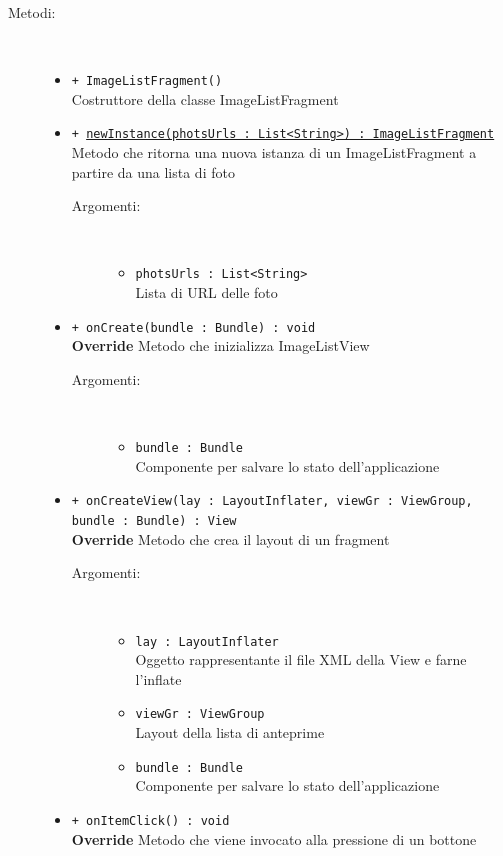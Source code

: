 \documentclass[../DefinizioneDiProdotto.tex]{subfiles}
\begin{document}
\begin{description}
\begin{itemize}
\end{itemize}
\item[Metodi:] \
\begin{itemize}
\item \texttt{+ ImageListFragment()}\\
Costruttore della classe ImageListFragment
 \item \texttt{+ \underline{newInstance(photsUrls : List<String>) : ImageListFragment}}\\
Metodo che ritorna una nuova istanza di un ImageListFragment a partire da una lista di foto
 \begin{description}
\item[Argomenti:] \
\begin{itemize}
\item \texttt{photsUrls : List<String>}\\
Lista di URL delle foto\end{itemize}
\end{description}
\item \texttt{+ onCreate(bundle : Bundle) : void}\\
\textbf{Override} Metodo che inizializza ImageListView
 \begin{description}
\item[Argomenti:] \
\begin{itemize}
\item \texttt{bundle : Bundle}\\
Componente per salvare lo stato dell'applicazione\end{itemize}
\end{description}
\item \texttt{+ onCreateView(lay : LayoutInflater, viewGr : ViewGroup, bundle : Bundle) : View}\\
\textbf{Override} Metodo che crea il layout di un fragment
 \begin{description}
\item[Argomenti:] \
\begin{itemize}
\item \texttt{lay : LayoutInflater}\\
Oggetto rappresentante il file XML della View e farne l'inflate\item \texttt{viewGr : ViewGroup}\\
Layout della lista di anteprime\item \texttt{bundle : Bundle}\\
Componente per salvare lo stato dell'applicazione\end{itemize}
\end{description}
\item \texttt{+ onItemClick() : void}\\
\textbf{Override} Metodo che viene invocato alla pressione di un bottone
 \end{itemize}
\end{description}
\end{document}
